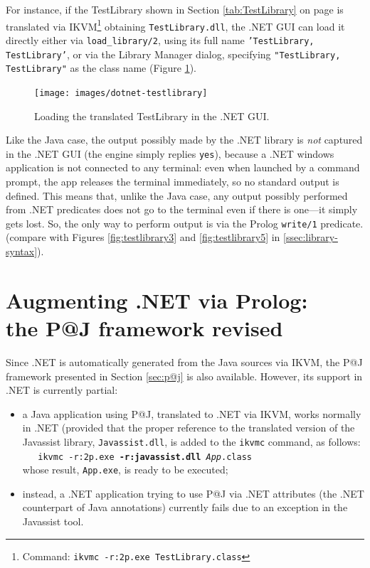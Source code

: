 For instance, if the TestLibrary shown in Section \ref{tab:TestLibrary} on page \pageref{tab:TestLibrary} is translated via IKVM\footnote{Command: \texttt{ikvmc -r:2p.exe TestLibrary.class}} obtaining \texttt{TestLibrary.dll}, the \tuprolog{}.NET GUI can load it directly either via \texttt{load\_library/2}, using its full name \texttt{'TestLibrary, TestLibrary'}, or via the Library Manager dialog, specifying \texttt{"TestLibrary, TestLibrary"} as the class name (Figure \ref{fig:dotnet-testlibrary}).

\begin{figure}
  \texttt{[image: images/dotnet-testlibrary]}
  \caption{Loading the translated TestLibrary in the \tuprolog{}.NET GUI.}\label{fig:dotnet-testlibrary}
\end{figure}

Like the Java case, the output possibly made by the .NET library is \textit{not} captured in the \tuprolog{}.NET GUI (the engine simply replies \texttt{yes}), because a .NET windows application is not connected to any terminal: even when launched by a command prompt, the app releases the terminal immediately, so no standard output is defined.
This means that, unlike the Java case, any output possibly performed from .NET predicates does not go to the terminal even if there is one---it simply gets lost. So, the only way to perform output is via the Prolog \texttt{write/1} predicate.
(compare with Figures \ref{fig:testlibrary3} and \ref{fig:testlibrary5} in \Section \ref{ssec:library-syntax}).


\section{Augmenting .NET via Prolog:\\the P@J framework revised}
\label{sec:dotnet-pj}

Since \tuprolog{}.NET is automatically generated from the Java sources via IKVM, the P@J framework presented in Section \ref{sec:p@j} is also available.
%
However, its support in .NET is currently partial:
\begin{itemize}
  \item a Java application using P@J, translated to .NET via IKVM, works normally in .NET (provided that the proper reference to the translated version of the Javassist library, \texttt{Javassist.dll}, is added to the \texttt{ikvmc} command, as follows:\\
      \texttt{\mbox{~~~}ikvmc -r:2p.exe \textbf{-r:javassist.dll} \textit{App}.class }\\
      whose result, \texttt{App.exe}, is ready to be executed;

  \item instead, a .NET application trying to use P@J via .NET attributes (the .NET counterpart of Java annotations) currently fails due to an exception in the Javassist tool.
\end{itemize}

